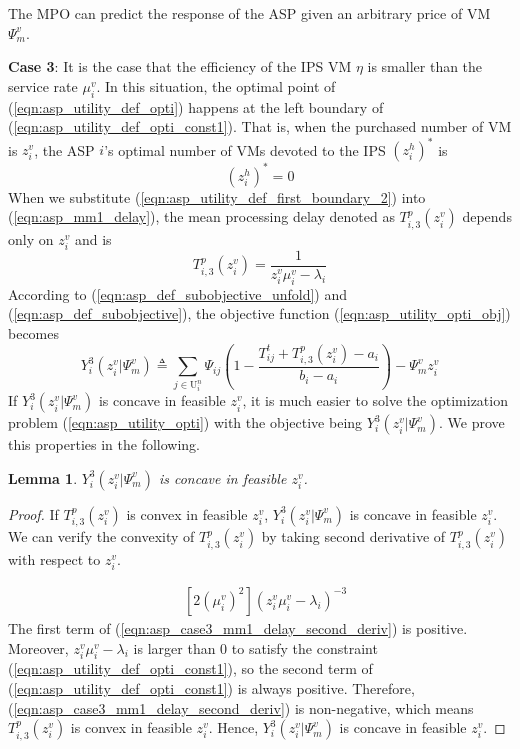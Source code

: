 \documentclass[conference]{IEEEtran}
\newtheorem{lemma}{Lemma}
\begin{document}
The MPO can predict the response of the ASP given an arbitrary price of VM $\Psi_m^v$.


\textbf{Case 3}: It is the case that the efficiency of the IPS VM $\eta$ is smaller than the service rate $\mu_i^v$. In this situation, the optimal point of (\ref{eqn:asp_utility_def_opti}) happens at the left boundary of (\ref{eqn:asp_utility_def_opti_const1}). That is, when the purchased number of VM is $z_i^v$, the ASP $i$'s optimal number of VMs devoted to the IPS $(z_i^h)^*$ is
\begin{equation} \label{eqn:asp_utility_def_first_boundary_2}
(z_i^h)^* = 0
\end{equation}
When we substitute (\ref{eqn:asp_utility_def_first_boundary_2}) into (\ref{eqn:asp_mm1_delay}), the mean processing delay denoted as $T_{i,3}^p(z_i^v)$ depends only on $z_i^v$ and is
\begin{equation}\label{eqn:asp_case3_mm1_delay}
T_{i,3}^p(z_i^v) = \frac{1}{z_i^v \mu_i^v-\lambda_i}
\end{equation}
According to (\ref{eqn:asp_def_subobjective_unfold}) and (\ref{eqn:asp_def_subobjective}), the objective function (\ref{eqn:asp_utility_opti_obj}) becomes
\begin{equation}\label{eqn:asp_case3_objective}
Y_i^3(z_i^v|\Psi_m^v) \triangleq \sum_{j \in \mathrm{U}_i^n}\Psi_{ij}(1-\frac{T_{ij}^t + T_{i,3}^p(z_i^v)-a_i}{b_i-a_i}) - \Psi_m^vz_i^v
\end{equation}
If $Y_i^3(z_i^v|\Psi_m^v)$ is concave in feasible $z_i^v$, it is much easier to solve the optimization problem (\ref{eqn:asp_utility_opti}) with the objective being $Y_i^3(z_i^v|\Psi_m^v)$. We prove this properties in the following.
\begin{lemma} \label{lemma:asp_case3_utility_concave}
$Y_i^3(z_i^v|\Psi_m^v)$ is concave in feasible $z_i^v$.
\end{lemma}
\begin{proof}
If $T_{i,3}^p(z_i^v)$ is convex in feasible $z_i^v$, $Y_i^3(z_i^v|\Psi_m^v)$ is concave in feasible $z_i^v$. We can verify the convexity of $T_{i,3}^p(z_i^v)$ by taking second derivative of $T_{i,3}^p(z_i^v)$ with respect to $z_i^v$.

\begin{equation} \label{eqn:asp_case3_mm1_delay_second_deriv}
\begin{aligned}
&[2(\mu_i^v)^2](z_i^v\mu_i^v-\lambda_i)^{-3}
\end{aligned}
\end{equation}
The first term of (\ref{eqn:asp_case3_mm1_delay_second_deriv}) is positive. Moreover, $z_i^v\mu_i^v - \lambda_i$ is larger than $0$ to satisfy the constraint (\ref{eqn:asp_utility_def_opti_const1}), so the second term of (\ref{eqn:asp_utility_def_opti_const1}) is always positive. Therefore, (\ref{eqn:asp_case3_mm1_delay_second_deriv}) is non-negative, which means $T_{i,3}^p(z_i^v)$ is convex in feasible $z_i^v$. Hence, $Y_i^3(z_i^v|\Psi_m^v)$ is concave in feasible $z_i^v$. \qedhere
\end{proof}
\end{document}
